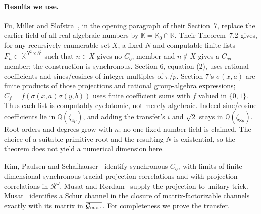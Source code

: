 \documentclass[11pt]{article}
\theoremstyle{definition}
\theoremstyle{remark}
\providecommand{\R}{\mathcal R}
\providecommand{\G}{\mathcal G}
\begin{document}
\paragraph{Results we use.}
Fu, Miller and Slofstra~\cite{FMS}, in the opening paragraph of their Section~7, replace the earlier field of all real algebraic numbers by $\mathbb K=\mathbb K_0\cap\mathbb R$. Their Theorem~7.2 gives, for any recursively enumerable set $X$, a fixed $N$ and computable finite lists $F_n\subset\mathbb K^{N^2\times8^2}$ such that $n\in X$ gives no $C_{qc}$ member and $n\notin X$ gives a $C_{qa}$ member; the construction is synchronous. Section 6, equation (2), uses rational coefficients and sines/cosines of integer multiples of $\pi/p$. Section 7's $\sigma(x,a)$ are finite products of those projections and rational group-algebra expressions; $C_f=f(\sigma(x,a)\sigma(y,b))$ uses finite coefficient sums with $f$ valued in $\{0,1\}$. Thus each list is computably cyclotomic, not merely algebraic. Indeed sine/cosine coefficients lie in $\mathbb Q(\zeta_{4p})$, and adding the transfer's $i$ and $\sqrt2$ stays in $\mathbb Q(\zeta_{8p})$. Root orders and degrees grow with $n$; no one fixed number field is claimed. The choice of a suitable primitive root and the resulting $N$ is existential, so the theorem does not yield a numerical dimension here.

Kim, Paulsen and Schafhauser~\cite[Thm.~3.6]{KPS18} identify synchronous $C_{qa}$ with limits of finite-dimensional synchronous tracial projection correlations and with projection correlations in $\R^\omega$. Musat and R{\o}rdam~\cite[Prop.~3.2]{MusatRordam} supply the projection-to-unitary trick. Musat~\cite[Prop.~3.9(iii)]{Musat25} identifies a Schur channel in the closure of matrix-factorizable channels exactly with its matrix in $\overline{\G_{\rm matr}}$. For completeness we prove the transfer.
\end{document}
